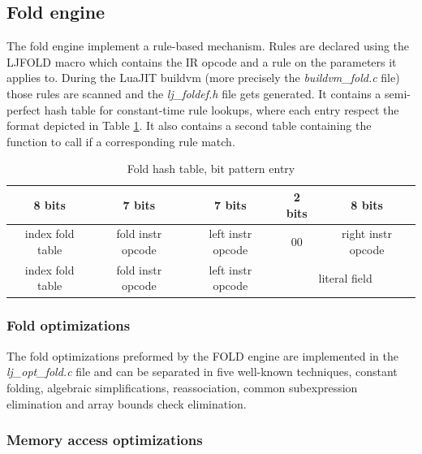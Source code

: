 
\subsection{Fold engine}
\label{Subsec:fold}

The fold engine implement a rule-based mechanism. Rules are declared using the
LJFOLD macro which contains the IR opcode and a rule on the parameters it
applies to. During the LuaJIT buildvm (more precisely the \emph{buildvm\_fold.c}
file) those rules are scanned and the \emph{lj\_foldef.h} file gets generated.
It contains a semi-perfect hash table for constant-time rule lookups, where each
entry respect the format depicted in Table \ref{tab:fold-format}. It also
contains a second table containing the function to call if a corresponding rule
match.

\begin{table}[H]
\centering
\caption{Fold hash table, bit pattern entry}
\label{tab:fold-format}
\begin{tabular}{|c|c|c|c|c|}
\hline
8 bits           & 7 bits            & 7 bits            & 2 bits   & 8 bits                      \\ \hline
index fold table & fold instr opcode & left instr opcode & 00       & right instr opcode      \\ \hline
index fold table & fold instr opcode & left instr opcode & \multicolumn{2}{c|}{literal field} \\ \hline
\end{tabular}
\end{table}

\subsubsection{Fold optimizations}
\label{Subsubsec:fold}

The fold optimizations preformed by the FOLD engine are implemented in the
\emph{lj\_opt\_fold.c} file and can be separated in five well-known techniques,
constant folding, algebraic simplifications, reassociation, common subexpression
elimination and array bounds check elimination.

\subsubsection{Memory access optimizations}
\label{Subsubsec:mao}

